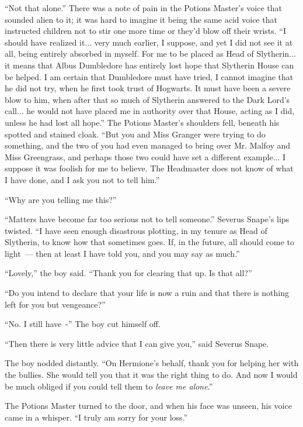 ``Not that alone.'' There was a note of pain in the Potions Master's voice that sounded alien to it; it was hard to imagine it being the same acid voice that instructed children not to stir one more time or they'd blow off their wrists. ``I should have realized it... very much earlier, I suppose, and yet I did not see it at all, being entirely absorbed in myself. For me to be placed as Head of Slytherin... it means that Albus Dumbledore has entirely lost hope that Slytherin House can be helped. I am certain that Dumbledore must have tried, I cannot imagine that he did not try, when he first took trust of Hogwarts. It must have been a severe blow to him, when after that so much of Slytherin answered to the Dark Lord's call... he would not have placed me in authority over that House, acting as I did, unless he had lost all hope.'' The Potions Master's shoulders fell, beneath his spotted and stained cloak. ``But you and Miss Granger were trying to do something, and the two of you had even managed to bring over Mr. Malfoy and Miss Greengrass, and perhaps those two could have set a different example... I suppose it was foolish for me to believe. The Headmaster does not know of what I have done, and I ask you not to tell him.''

``Why are you telling me this?''

``Matters have become far too serious not to tell someone.'' Severus Snape's lips twisted. ``I have seen enough disastrous plotting, in my tenure as Head of Slytherin, to know how that sometimes goes. If, in the future, all should come to light~--- then at least I have told you, and you may say as much.''

``Lovely,'' the boy said. ``Thank you for clearing that up. Is that all?''

``Do you intend to declare that your life is now a ruin and that there is nothing left for you but vengeance?''

``No. I still have~-'' The boy cut himself off.

``Then there is very little advice that I can give you,'' said Severus Snape.

The boy nodded distantly. ``On Hermione's behalf, thank you for helping her with the bullies. She would tell you that it was the right thing to do. And now I would be much obliged if you could tell them to \emph{leave me alone}.''

The Potions Master turned to the door, and when his face was unseen, his voice came in a whisper. ``I truly am sorry for your loss.''

